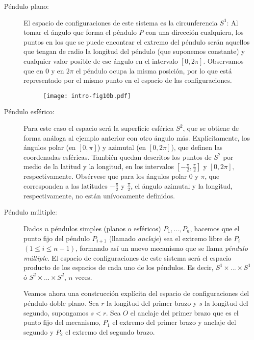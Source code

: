 \documentclass[\main/VD_completo.tex]{subfiles}
\begin{document}
\begin{description}
	
\item[Péndulo plano:] El espacio de configuraciones de este sistema es la
  circunferencia $S^{1}$: Al tomar el ángulo que forma el péndulo $P$ con una
  dirección cualquiera, los puntos en los que se puede encontrar el extremo del
  péndulo serán aquellos que tengan de radio la longitud del péndulo (que
  suponemos constante) y cualquier valor posible de ese ángulo en el intervalo
  $[0,2\pi]$. Observamos que en $0$ y en $2\pi$ el péndulo ocupa la misma
  posición, por lo que está representado por el mismo punto en el espacio de las
  configuraciones.

  \begin{figure}[ht]
    \centering
    \texttt{[image: intro-fig10b.pdf]} %
    \caption{}
    \label{fig10b}
  \end{figure}
  
\item[Péndulo esférico:] Para este caso el espacio será la superficie esférica
  $S^{2}$, que se obtiene de forma análoga al ejemplo anterior con otro ángulo
  más. Explícitamente, los ángulos polar (en $[0,\pi]$) y azimutal (en
  $[0,2\pi]$), que definen las coordenadas esféricas.
  También quedan descritos los puntos de $S^{2}$ por medio de la latitud y la
  longitud, en los intervalos $[-\frac{\pi}{2},\frac{\pi}{2}]$ y $[0,2\pi]$,
  respectivamente. Obsérvese que para los ángulos polar $0$ y $\pi$, que
  corresponden a las latitudes $-\frac{\pi}{2}$ y $\frac{\pi}{2}$, el ángulo
  azimutal y la longitud, respectivamente, no están unívocamente definidos.

\item[Péndulo múltiple:] Dados $n$ péndulos simples (planos o esféricos)
  $P_1,\dots,P_n$, hacemos que el punto fijo del péndulo $P_{i+1}$ (llamado
  \emph{anclaje}) sea el extremo libre de $P_i$ $(1\leq i \leq n-1)$, formando
  así un nuevo mecanismo que se llama \emph{péndulo múltiple}. El espacio de
  configuraciones de este sistema será el espacio producto de los espacios de
  cada uno de los péndulos. Es decir, $S^1\times ... \times S^1$ ó $S^2 \times
  ... \times S^2$, $n$ veces.
  
  Veamos ahora una construcción explícita del espacio de configuraciones del
  péndulo doble plano. Sea $r$ la longitud del primer brazo y $s$ la longitud
  del segundo, supongamos $s<r$. Sea $O$ el anclaje del primer brazo que es el
  punto fijo del mecanismo, $P_1$ el extremo del primer brazo y anclaje del
  segundo y $P_2$ el extremo del segundo brazo.
  

\end{description}
\end{document}

